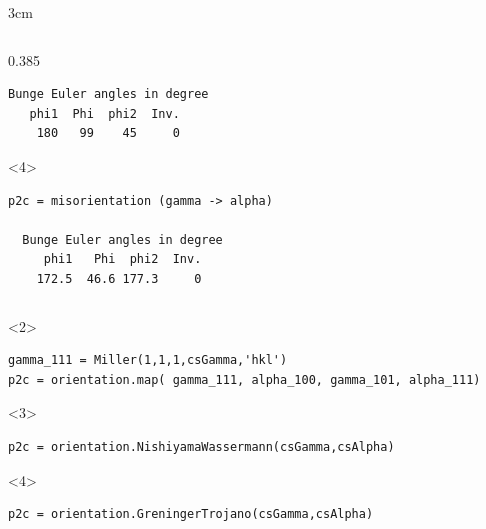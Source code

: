 \documentclass[compress,aspectratio=1610,fleqn,10pt]{beamer}
\begin{document}
\begin{frame}[fragile]
\begin{overlayarea}{\textwidth}{3cm}
\begin{columns}[T,onlytextwidth]
\begin{column}{0.385\textwidth}
\begin{onlyenv}
\begin{lstlisting}[style=output]
  Bunge Euler angles in degree
   phi1  Phi  phi2  Inv.
    180   99    45     0
\end{lstlisting}
    \end{onlyenv}
    \begin{onlyenv}<4>
\begin{lstlisting}[style=output]
p2c = misorientation (gamma -> alpha)
 
  Bunge Euler angles in degree
     phi1   Phi  phi2  Inv.
    172.5  46.6 177.3     0
\end{lstlisting}
    \end{onlyenv}
  \end{column}
\end{columns}
  \begin{onlyenv}<2>
\begin{lstlisting}[style=input]
gamma_111 = Miller(1,1,1,csGamma,'hkl')
p2c = orientation.map( gamma_111, alpha_100, gamma_101, alpha_111)
\end{lstlisting}
    \end{onlyenv}
    \begin{onlyenv}<3>
\begin{lstlisting}[style=input]
p2c = orientation.NishiyamaWassermann(csGamma,csAlpha)
\end{lstlisting}
    \end{onlyenv}
    \begin{onlyenv}<4>
\begin{lstlisting}[style=input]
p2c = orientation.GreningerTrojano(csGamma,csAlpha)
\end{lstlisting}
    \end{onlyenv}
  \end{overlayarea}
\end{frame}
\end{document}
